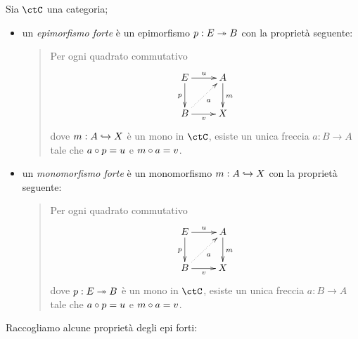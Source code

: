 \begin{definition}
	Sia \(\ctC\) una categoria;
	\begin{itemize}
		\item un \emph{epimorfismo forte} è un epimorfismo \(p : E\twoheadrightarrow B\) con la proprietà seguente:
		      \begin{quote}
			      Per ogni quadrato commutativo
			      \[\xymatrix{
					      E \ar[r]^u\ar[d]_p & A\ar[d]^m\\
					      B \ar[r]_v \ar@{.>}[ur]_a & X
				      }\]
			      dove \(m : A\hookrightarrow X\) è un mono in \(\ctC\), esiste un unica freccia \(a : B\to A\) tale che \(a\circ p=u\) e \(m\circ a =v\).
		      \end{quote}
		\item un \emph{monomorfismo forte} è un monomorfismo \(m : A\hookrightarrow X\) con la proprietà seguente:
		      \begin{quote}
			      Per ogni quadrato commutativo
			      \[\xymatrix{
					      E \ar[r]^u\ar[d]_p & A\ar[d]^m\\
					      B \ar[r]_v \ar@{.>}[ur]_a & X
				      }\]
			      dove \(p : E\twoheadrightarrow B\) è un mono in \(\ctC\), esiste un unica freccia \(a : B\to A\) tale che \(a\circ p=u\) e \(m\circ a =v\).
		      \end{quote}
	\end{itemize}
\end{definition}
Raccogliamo alcune proprietà degli epi forti:
\begin{proposition}
	\Todo{}
\end{proposition}
